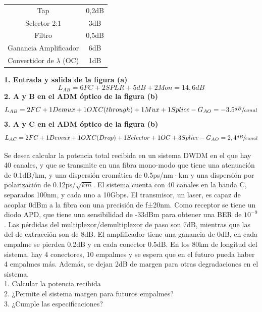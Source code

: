 \begin{exercise}[8]
\begin{center}
\begin{tabular}{c | c}
	Tap						& 0,2dB\\
	Selector 2:1			& 3dB\\
	Filtro					& 0,5dB\\
	Ganancia Amplificador	& 6dB\\
	Convertidor de $\lambda$ (OC)	& 1dB\\\hline
\end{tabular}
\end{center}
\textbf{1. Entrada y salida de la figura (a)}\\
\[L_{AB}=6FC+2SPLR+5dB+2Mon=14,6dB\] 
\textbf{2. A y B en el ADM óptico de la figura (b)}\\
\[L_{AB}=2FC+1Demux+1OXC(through)+1Mux+1Splice-G_{AO}=-3.5\sfrac{dB}{canal}\]
\textbf{3. A y C en el ADM óptico de la figura (b)}\\
\[L_{AC}=2FC+1Demux+1OXC(Drop)+1Selector+1OC+3Splice-G_{AO}=2,4\sfrac{dB}{canal}\]
\end{exercise}
\begin{exercise}[9]
	Se desea calcular la potencia total recibida en un sistema DWDM en el que hay 40 canales, y que se transmite en una fibra mono-modo que tiene una atenuación de 0.1dB/km, y una dispersión cromática de 0.5ps/nm·km y una dispersión por polarización de 0.12ps/$\sqrt{km}$. El sistema cuenta con 40 canales en la banda C, separados 100nm, y cada uno a 10Gbps. El transmisor, un laser, es capaz de acoplar 0dBm a la fibra con una precisión de f±20nm. Como receptor se tiene un diodo APD, que tiene una sensibilidad de -33dBm para obtener una BER de $10^{-9}$ . Las pérdidas del multiplexor/demultiplexor de paso son 7dB, mientras que las del de extracción son de 8dB. El amplificador tiene una ganancia de 0dB, en cada empalme se pierden 0.2dB y en cada conector 0.5dB. En los 80km de longitud del sistema, hay 4 conectores, 10 empalmes y se espera que en el futuro pueda haber 4 empalmes más. Además, se dejan 2dB de margen para otras degradaciones en el sistema.\\
1. Calcular la potencia recibida\\
2. ¿Permite el sistema margen para futuros empalmes?\\
3. ¿Cumple las especificaciones?
\end{exercise}

